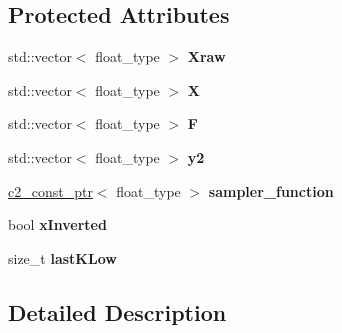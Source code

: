 \subsection*{Protected Attributes}
\begin{DoxyCompactItemize}
\item 
\hypertarget{classinterpolating__function__p_acd71560b0fc125d028847ad906207a62}{std\-::vector$<$ float\-\_\-type $>$ {\bfseries Xraw}}\label{classinterpolating__function__p_acd71560b0fc125d028847ad906207a62}

\item 
\hypertarget{classinterpolating__function__p_a2ae94315914ef71afb6e9f84f8383e61}{std\-::vector$<$ float\-\_\-type $>$ {\bfseries X}}\label{classinterpolating__function__p_a2ae94315914ef71afb6e9f84f8383e61}

\item 
\hypertarget{classinterpolating__function__p_a481dee592a5a5ec9ec3fb1aae31a8865}{std\-::vector$<$ float\-\_\-type $>$ {\bfseries F}}\label{classinterpolating__function__p_a481dee592a5a5ec9ec3fb1aae31a8865}

\item 
\hypertarget{classinterpolating__function__p_a7d9729f0ccd503a4eb2f1880f035805a}{std\-::vector$<$ float\-\_\-type $>$ {\bfseries y2}}\label{classinterpolating__function__p_a7d9729f0ccd503a4eb2f1880f035805a}

\item 
\hypertarget{classinterpolating__function__p_aa0c58578b4b40ec3f9154cb06d18764e}{\hyperlink{classc2__const__ptr}{c2\-\_\-const\-\_\-ptr}$<$ float\-\_\-type $>$ {\bfseries sampler\-\_\-function}}\label{classinterpolating__function__p_aa0c58578b4b40ec3f9154cb06d18764e}

\item 
\hypertarget{classinterpolating__function__p_a2eaaea5d2083d93d0a8d4825a9f5bbfe}{bool {\bfseries x\-Inverted}}\label{classinterpolating__function__p_a2eaaea5d2083d93d0a8d4825a9f5bbfe}

\item 
\hypertarget{classinterpolating__function__p_a2f051073f09c909c5770a324862099b6}{size\-\_\-t {\bfseries last\-K\-Low}}\label{classinterpolating__function__p_a2f051073f09c909c5770a324862099b6}

\end{DoxyCompactItemize}


\subsection{Detailed Description}
